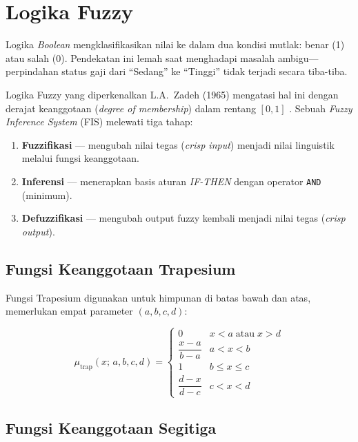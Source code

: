 \documentclass[12pt,a4paper]{report}
\begin{document}
\section{Logika Fuzzy}

Logika \textit{Boolean} mengklasifikasikan nilai ke dalam dua
kondisi mutlak: benar (1) atau salah (0). Pendekatan ini lemah
saat menghadapi masalah ambigu—perpindahan status gaji dari
``Sedang'' ke ``Tinggi'' tidak terjadi secara tiba-tiba.

Logika Fuzzy yang diperkenalkan L.A.\ Zadeh (1965) mengatasi
hal ini dengan derajat keanggotaan (\textit{degree of
membership}) dalam rentang $[0, 1]$ \cite{zadeh1988}. Sebuah
\textit{Fuzzy Inference System} (FIS) melewati tiga tahap:

\begin{enumerate}[label=\arabic*.]
  \item \textbf{Fuzzifikasi} — mengubah nilai tegas
        (\textit{crisp input}) menjadi nilai linguistik melalui
        fungsi keanggotaan.
  \item \textbf{Inferensi} — menerapkan basis aturan
        \textit{IF-THEN} dengan operator \texttt{AND} (minimum).
  \item \textbf{Defuzzifikasi} — mengubah output fuzzy kembali
        menjadi nilai tegas (\textit{crisp output}).
\end{enumerate}

\subsection{Fungsi Keanggotaan Trapesium}

Fungsi Trapesium digunakan untuk himpunan di batas bawah dan
atas, memerlukan empat parameter $(a, b, c, d)$:

\begin{equation}
  \mu_{\mathrm{trap}}(x;\,a,b,c,d) =
  \begin{cases}
    0                        & x < a \;\text{atau}\; x > d \\[4pt]
    \dfrac{x-a}{b-a}         & a < x < b \\[6pt]
    1                        & b \le x \le c \\[6pt]
    \dfrac{d-x}{d-c}         & c < x < d
  \end{cases}
  \label{eq:trapesium}
\end{equation}

\subsection{Fungsi Keanggotaan Segitiga}
\end{document}
